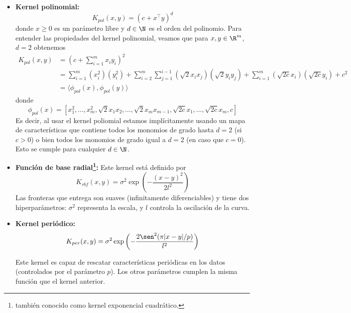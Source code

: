\begin{itemize}
    \item   \textbf{Kernel polinomial:}
    \begin{equation}
       K_{pol} (x, y) = (c + x^\top y)^d
    \end{equation}
    donde $x\geq 0$ es un parámetro libre y $d\in\N$ es el orden del polinomio. Para entender las propiedades del kernel polinomial, veamos que para $x,y\in\R^m$, $d=2$ obtenemos 
    \begin{align}
        K_{pol} (x, y)  &= \left(c + \sum_{i=1}^m x_iy_i\right)^2\\
                        &= \sum_{i=1}^m (x_i^2)(y_i^2) + \sum_{i=2}^m \sum_{j=1}^{i-1} (\sqrt{2}x_ix_j)(\sqrt{2}y_iy_j) + \sum_{i=1}^m (\sqrt{2c}x_i)(\sqrt{2c}y_i) + c^2\\
                        &=\langle \phi_{pol}(x) , \phi_{pol}(y) \rangle
    \end{align}
    donde 
    \begin{equation}
        \phi_{pol}(x) = [x_1^2,\ldots,x_m^2,\sqrt{2}x_1x_2,\ldots, \sqrt{2}x_{m}x_{m-1},\sqrt{2c}x_1,\ldots,\sqrt{2c}x_m,c]
    \end{equation}
    Es decir, al usar el kernel poliomial estamos implícitamente usando un mapa de características que contiene todos los monomios de grado hasta $d=2$ (si $c>0$) o bien todos los monomios de grado igual a $d=2$ (en caso que $c=0$). Esto se cumple para cualquier $d\in\N$.
    \item \textbf{Función de base radial\footnote{también conocido como kernel exponencial cuadrático.}:} Este kernel está definido por
    \begin{equation}
        K_{rbf} (x , y ) = \sigma^2 \exp\left(-\frac{(x -y)^2}{2l^2}\right)
    \end{equation}
    Las fronteras que entrega son suaves (infinitamente diferenciables) y tiene dos hiperparámetros: $\sigma^2$ representa la escala, y $l$ controla la oscilación de la curva. 
    
    \item \textbf{Kernel periódico:}
    \begin{equation}
       K_{per} (x , y) = \sigma^2 \exp\left(- \frac{2\sen^2 (\pi|x -y|/p)}{l^2}\right) 
    \end{equation}
    
    Este kernel es capaz de rescatar características periódicas en los datos (controlados por el parámetro $p$). Los otros parámetros cumplen la misma función que el kernel anterior. 

    
\end{itemize}

